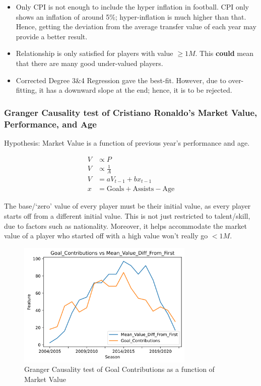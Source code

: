 \documentclass[
  english,
  doc,floatsintext]{apa6}
\providecommand{\tightlist}{%
  \setlength{\itemsep}{0pt}\setlength{\parskip}{0pt}}
\begin{document}
\begin{itemize}
\tightlist
\item
  Only CPI is not enough to include the hyper inflation in football. CPI only shows an inflation of around 5\%; hyper-inflation is much higher than that. Hence, getting the deviation from the average transfer value of each year may provide a better result.
\item
  Relationship is only satisfied for players with value \(\ge 1M\). This \textbf{could} mean that there are many good under-valued players.
\item
  Corrected Degree 3\&4 Regression gave the best-fit. However, due to over-fitting, it has a downward slope at the end; hence, it is to be rejected.
\end{itemize}

\hypertarget{granger-causality-test-of-cristiano-ronaldos-market-value-performance-and-age}{%
\subsubsection{Granger Causality test of Cristiano Ronaldo's Market Value, Performance, and Age}\label{granger-causality-test-of-cristiano-ronaldos-market-value-performance-and-age}}

Hypothesis: Market Value is a function of previous year's performance and age.

\[
\begin{aligned}
V &\propto P \\
V & \propto \frac{1}{A} \\
V &= a V_{t-1} + b x_{t-1} \\
x &= \text{Goals} + \text{Assists} - \text{Age}
\end{aligned}
\]

The base/`zero' value of every player must be their initial value, as every player starts off from a different initial value. This is not just restricted to talent/skill, due to factors such as nationality. Moreover, it helps accommodate the market value of a player who started off with a high value won't really go \(< 1M\).

\begin{figure}[H]
  \begin{center}
  \includegraphics[width=0.9\linewidth, height=6cm]{assets/Goal_Contributions vs Mean_Value_Diff_From_First.png}
  \end{center}
  
  \captionsetup{justification=centering}
  \caption{Granger Causality test of Goal Contributions as a function of Market Value}
\end{figure}
\end{document}
